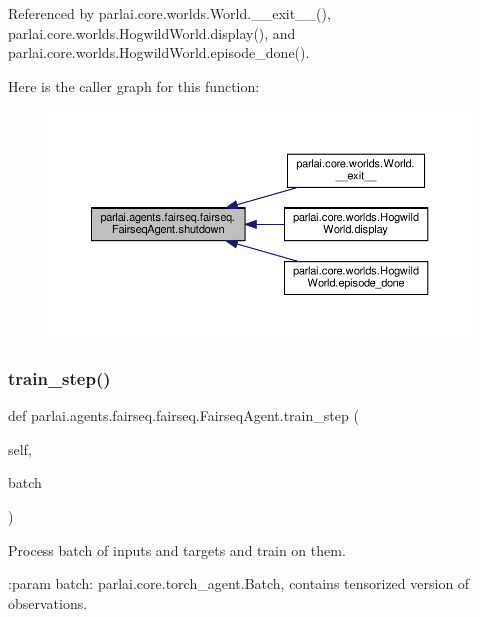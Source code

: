 Referenced by parlai.\+core.\+worlds.\+World.\+\_\+\+\_\+exit\+\_\+\+\_\+(), parlai.\+core.\+worlds.\+Hogwild\+World.\+display(), and parlai.\+core.\+worlds.\+Hogwild\+World.\+episode\+\_\+done().

Here is the caller graph for this function\+:
\nopagebreak
\begin{figure}[H]
\begin{center}
\leavevmode
\includegraphics[width=350pt]{classparlai_1_1agents_1_1fairseq_1_1fairseq_1_1FairseqAgent_a76856ecae016691ada6f7187d6aa744a_icgraph}
\end{center}
\end{figure}
\mbox{\label{classparlai_1_1agents_1_1fairseq_1_1fairseq_1_1FairseqAgent_a57902d8fdb473ce9d791df532db41eee}} 
\subsubsection{\texorpdfstring{train\+\_\+step()}{train\_step()}}
{\footnotesize\ttfamily def parlai.\+agents.\+fairseq.\+fairseq.\+Fairseq\+Agent.\+train\+\_\+step (\begin{DoxyParamCaption}\item[{}]{self,  }\item[{}]{batch }\end{DoxyParamCaption})}

\begin{DoxyVerb}Process batch of inputs and targets and train on them.

:param batch: parlai.core.torch_agent.Batch, contains tensorized
      version of observations.
\end{DoxyVerb}
 

